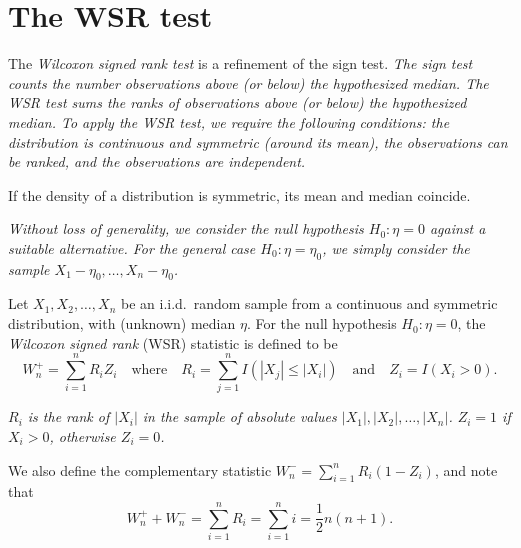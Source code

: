 \section{The WSR test}
The \emph{Wilcoxon signed rank test} is a refinement of the sign test.
\bit
\it The sign test counts the number observations above (or below) the hypothesized median.
\it The WSR test sums the ranks of observations above (or below) the hypothesized median.
\eit
To apply the WSR test, we require the following conditions:
\ben
\it the distribution is continuous and symmetric (around its mean),
\it the observations can be ranked, and
\it the observations are independent.
\een

\begin{remark}
If the density of a distribution is symmetric, its mean and median coincide.
\end{remark}

\bit
\it Without loss of generality, we consider the null hypothesis $H_0:\eta=0$ against a suitable alternative.
\it For the general case $H_0:\eta=\eta_0$, we simply consider the sample $X_1-\eta_0,\ldots,X_n-\eta_0$.
\eit

\begin{definition}
Let $X_1,X_2,\ldots,X_n$ be an i.i.d.\ random sample from a continuous and symmetric distribution, with (unknown) median $\eta$. For the null hypothesis $H_0:\eta=0$, the \emph{Wilcoxon signed rank} (WSR) statistic is defined to be
\[
W^{+}_n = \sum_{i=1}^n R_i Z_i \quad\text{where}\quad R_i = \sum_{j=1}^n I(|X_j|\leq |X_i|) \quad\text{and}\quad Z_i=I(X_i>0).
\]
\end{definition}

\bit
\it $R_i$ is the rank of $|X_i|$ in the sample of absolute values $|X_1|,|X_2|,\ldots,|X_n|$.
\it $Z_i=1$ if $X_i>0$, otherwise $Z_i=0$.
\eit

We also define the complementary statistic $W^{-}_n = \displaystyle\sum_{i=1}^n R_i(1-Z_i)$, and note that
\[
W^{+}_n + W^{-}_n = \sum_{i=1}^n R_i = \sum_{i=1}^n i = \frac{1}{2}n(n+1).
\]

